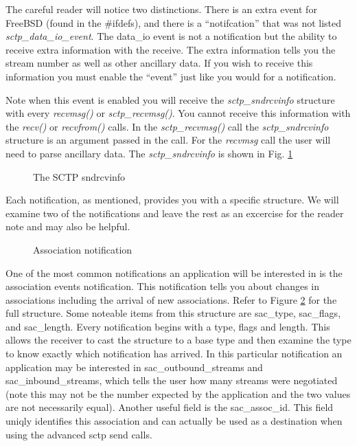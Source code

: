 \documentclass[conference]{IEEEtran}
\begin{document}
The careful reader will notice two distinctions. There is an extra event
for FreeBSD (found in the \#ifdefs), and there is a ``notifcation'' that was 
not listed \emph{sctp\_data\_io\_event}. The data\_io event is not a 
notification but the ability to receive extra information with the receive.
The extra information tells you the stream number as well as other
ancillary data. If you wish to receive this information you must enable
the ``event'' just like  you would for a notification. 

Note when this event
is enabled you will receive the \emph{sctp\_sndrcvinfo} structure with every
\emph{recvmsg()} or \emph{sctp\_recvmsg()}. You cannot receive
this information with the \emph{recv()} or \emph{recvfrom()} calls. In the
\emph{sctp\_recvmsg()} call the \emph{sctp\_sndrcvinfo}  structure is an
argument passed in the call. For the \emph{recvmsg} call the user will
need to parse ancillary data. The \emph{sctp\_sndrcvinfo}  is shown in Fig. \ref{fig:sndrcv}
\begin{figure}

\caption{The SCTP sndrcvinfo}
\label{fig:sndrcv}
\end{figure}

Each notification, as mentioned, provides you with a specific structure. 
We will examine two of the notifications and leave the rest
as an excercise for the reader note \cite{socketdraft} and \cite{stevensapi} may
also be helpful.

\begin{figure}

\caption{Association notification}
\label{fig:assocnotify}
\end{figure}

One of the most common notifications an application will be interested in is
the association events notification. This notification tells you about changes in
associations including the arrival of new associations.  Refer to Figure \ref{fig:assocnotify} for the full structure.
Some noteable items from this structure are sac\_type, sac\_flags, and sac\_length. Every notification
begins with a type, flags and length. This allows the receiver to cast the structure to a base type and then
examine the type to know exactly which notification has arrived. In this particular notification
an application may be interested in sac\_outbound\_streams and sac\_inbound\_streams, which tells
the user how many streams were negotiated (note this may not be the number expected by
the application and the two values are not necessarily equal). Another useful field is the
sac\_assoc\_id. This field uniqly identifies this association and can actually be used as a destination
when using the advanced sctp send calls.
\end{document}
